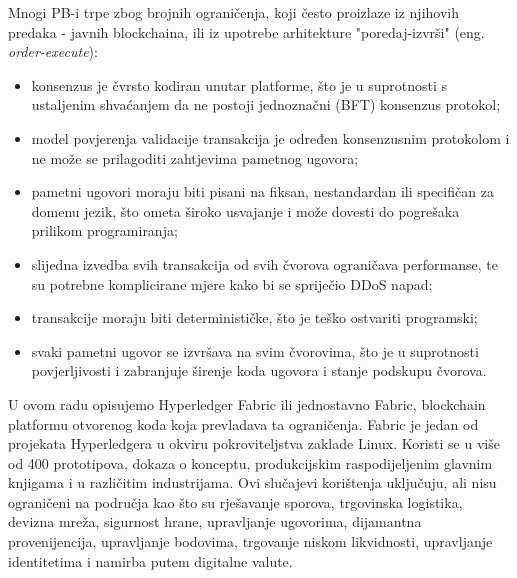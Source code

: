 \documentclass[times, utf8, diplomski]{fer}
\begin{document}
Mnogi PB-i trpe zbog brojnih ograničenja, koji često proizlaze iz njihovih predaka - javnih blockchaina, ili iz upotrebe arhitekture "poredaj-izvrši" (eng. \textit{order-execute}):

\begin{itemize}

\item konsenzus je čvrsto kodiran unutar platforme, što je u suprotnosti s ustaljenim shvaćanjem da ne postoji jednoznačni (BFT) konsenzus protokol;

\item model povjerenja validacije transakcija je određen konsenzusnim protokolom i ne može se prilagoditi zahtjevima pametnog ugovora;

\item pametni ugovori moraju biti pisani na fiksan, nestandardan ili specifičan za domenu jezik, što ometa široko usvajanje i može dovesti do pogrešaka prilikom programiranja;

\item slijedna izvedba svih transakcija od svih čvorova ograničava performanse, te su potrebne komplicirane mjere kako bi se spriječio DDoS napad;

\item transakcije moraju biti determinističke, što je teško ostvariti programski;

\item svaki pametni ugovor se izvršava na svim čvorovima, što je u suprotnosti povjerljivosti i zabranjuje širenje koda ugovora i stanje podskupu čvorova. \cite{Fabric}

\end{itemize}

U ovom radu opisujemo Hyperledger Fabric ili jednostavno Fabric, blockchain
platformu otvorenog koda koja prevladava ta ograničenja. Fabric je jedan od projekata Hyperledgera u okviru pokroviteljstva zaklade Linux. Koristi se u više od 400 prototipova, dokaza o konceptu, produkcijskim raspodijeljenim glavnim knjigama i u različitim industrijama. Ovi slučajevi korištenja uključuju, ali nisu ograničeni na područja kao što su rješavanje sporova, trgovinska logistika, devizna mreža, sigurnost hrane, upravljanje ugovorima, dijamantna provenijencija, upravljanje bodovima, trgovanje niskom likvidnosti, upravljanje identitetima i namirba putem digitalne valute.
\end{document}
